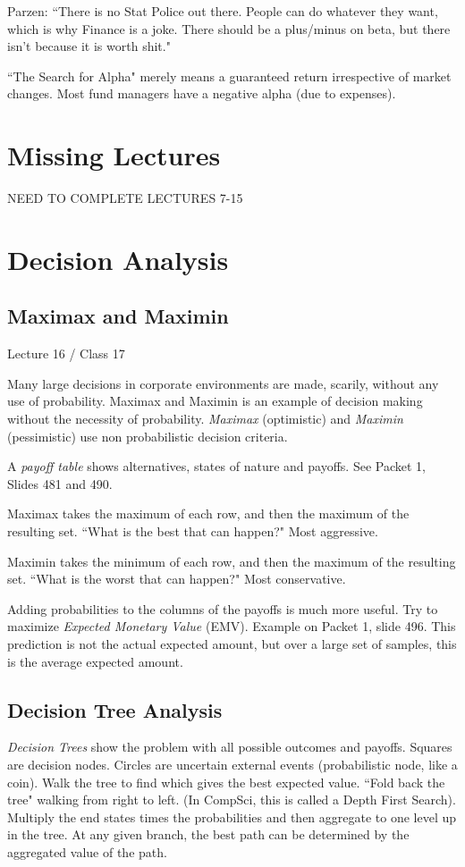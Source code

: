 \documentclass[11pt, oneside]{article}   	%
\begin{document}
Parzen: ``There is no Stat Police out there. People can do whatever they want, which is why Finance is a joke. There should be a plus/minus on beta, but there isn't because it is worth shit."  

``The Search for Alpha" merely means a guaranteed return irrespective of market changes. Most fund managers have a negative alpha (due to expenses).

\section{Missing Lectures}
NEED TO COMPLETE LECTURES 7-15


\section{Decision Analysis}

\subsection{Maximax and Maximin}
Lecture 16 / Class 17

Many large decisions in corporate environments are made, scarily, without any use of probability. Maximax and Maximin is an example of decision making without the necessity of probability. 
\textit{Maximax} (optimistic) and \textit{Maximin} (pessimistic)  use non probabilistic decision criteria. 

A \textit{payoff table} shows alternatives, states of nature and payoffs. See Packet 1, Slides 481 and 490. 

Maximax takes the maximum of each row, and then the maximum of the resulting set. ``What is the best that can happen?" Most aggressive.

Maximin takes the minimum of each row, and then the maximum of the resulting set. ``What is the worst that can happen?" Most conservative.

Adding probabilities to the columns of the payoffs is much more useful. Try to maximize \textit{Expected Monetary Value} (EMV). Example on Packet 1, slide 496. This prediction is not the actual expected amount, but over a large set of samples, this is the average expected amount. 

\subsection{Decision Tree Analysis}

\textit{Decision Trees} show the problem with all possible outcomes and payoffs. Squares are decision nodes. Circles are uncertain external events (probabilistic node, like a coin). Walk the tree to find which gives the best expected value. ``Fold back the tree" walking from right to left. (In CompSci, this is called a Depth First Search). Multiply the end states times the probabilities and then aggregate to one level up in the tree. At any given branch, the best path can be determined by the aggregated value of the path.
\end{document}
